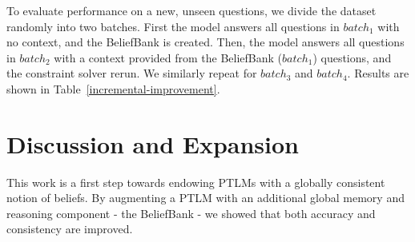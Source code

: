 \documentclass[11pt]{article}
\begin{document}
To evaluate performance on a new, unseen questions,
we divide the dataset randomly into two batches.
First the model answers all questions in $batch_1$ with no context, and the BeliefBank
is created. Then, the model answers all
questions in $batch_2$ with a context provided from the BeliefBank ($batch_1$) questions,
and the constraint solver rerun. We similarly repeat for $batch_3$ and $batch_4$.
Results are shown in Table~\ref{incremental-improvement}.

\section{Discussion and Expansion}
This work is a first step towards endowing PTLMs with a globally consistent notion of beliefs. By augmenting a PTLM with an additional global memory and reasoning component - the BeliefBank - we showed that both accuracy and consistency are improved. 
\end{document}
